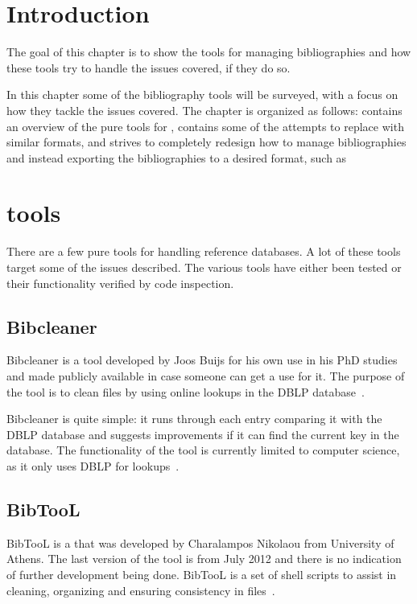 \section{Introduction}
The goal of this chapter is to show the tools for managing
bibliographies and how these tools try to handle the issues covered,
if they do so.

In this chapter some of the bibliography tools will be surveyed, with
a focus on how they tackle the issues covered.  The chapter is
organized as follows:  contains an overview
of the pure tools for {\bibtex}, 
contains some of the attempts to replace {\bibtex} with similar
formats, and  strives to
completely redesign how to manage bibliographies and instead
exporting the bibliographies to a desired format, such as {\bibtex}


\section{{\bibtex} tools}
\label{sec:bibtex_tools}
There are a few pure {\bibtex} tools for handling reference databases.
A lot of these tools target some of the issues described.  The
various tools have either been tested or their functionality verified
by code inspection.

\subsection{Bibcleaner}
Bibcleaner is a tool developed by Joos Buijs for his own use in his
PhD studies and made publicly available in case someone can get a use
for it.  The purpose of the tool is to clean {\bibtex} files by using
online lookups in the DBLP database~\cite{bibcleaner_question,
  bibcleaner_source}.

Bibcleaner is quite simple: it runs through each entry comparing it
with the DBLP database and suggests improvements if it can find the
current key in the database.  The functionality of the tool is
currently limited to computer science, as it only uses DBLP for
lookups~\cite{bibcleaner_source}.

\subsection{BibTooL}
BibTooL is a {\bibtex} that was developed by Charalampos Nikolaou from
University of Athens.  The last version of the tool is from July 2012
and there is no indication of further development being done.  BibTooL
is a set of shell scripts to assist in cleaning, organizing and
ensuring consistency in {\bibtex} files~\cite{bibtool_site}.

